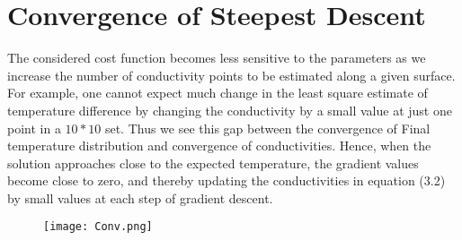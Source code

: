 \documentclass[10pt,a4paper]{report}
\begin{document}
\section{Convergence of Steepest Descent}

The considered cost function becomes less sensitive to the parameters as we increase the number of conductivity points to be estimated along a given surface. For example, one cannot expect much change in the least square estimate of temperature difference by changing the conductivity by a small value at just one point in a $10*10$ set. Thus we see this gap between the convergence of Final temperature distribution and convergence of conductivities. Hence, when the solution approaches close to the expected temperature, the gradient values become close to zero, and thereby updating the conductivities in equation (3.2)  by small values at each step of gradient descent.
\begin{figure}[H]
\begin{center}
\texttt{[image: Conv.png]} 
\caption{} %
\label{fig:Conv}
\end{center}
\end{figure}


%
%
%
\end{document}
